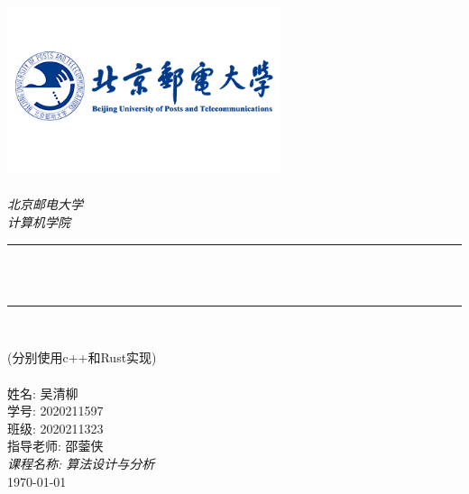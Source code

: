 \begin{titlepage}
	\newcommand{\HRule}{\rule{\linewidth}{0.5mm}}
	\includegraphics[width=8cm]{title/logo_bupt.png}\\[1cm]
	\center
	\quad\\[1.5cm]
	\textsl{\Large 北京邮电大学}\\[0.5cm]
	\textsl{\large  计算机学院}\\[0.5cm]
	\makeatletter
	\HRule \\[0.4cm]
	{\huge \bfseries \@title}\\[0.4cm]
	\HRule \\[0.5cm]
	\begin{minipage}{0.4\textwidth}
	\end{minipage}
	\large {(分别使用c++和Rust实现)}\\[2cm]
	~\\[2cm] %

	\makeatother
	{\large 姓名: 吴清柳}\\[0.5cm]
	{\large 学号: 2020211597}\\[0.5cm]
	{\large 班级: 2020211323}\\[0.5cm]
	{\large 指导老师: 邵蓥侠}\\[0.5cm]
	{\large \emph{课程名称: 算法设计与分析}}\\[0.5cm]
	{\large \today}\\[2cm]
	\vfill
\end{titlepage}
